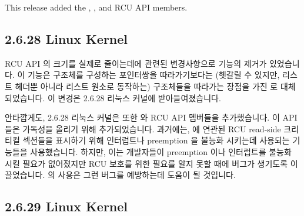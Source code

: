 This release added the
,
, and
 RCU API members.
\fi

\subsection{2.6.28 Linux Kernel}

RCU API 의 크기를 실제로 줄이는데에 관련된 변경사항으로
 기능의 제거가 있었습니다.
이 기능은  구조체를 구성하는 포인터쌍을 따라가기보다는 (헷갈릴 수
있지만, 리스트 헤더뿐 아니라 리스트 원소로 동작하는) 구조체들을 따라가는 장점을
가진  로 대체되었습니다.
이 변경은 2.6.28 리눅스 커널에 받아들여졌습니다.

안타깝게도, 2.6.28 리눅스 커널은 또한  와
 RCU API 멤버들을 추가했습니다.
이 API 들은 가독성을 올리기 위해 추가되었습니다.
과거에는,  에 연관된 RCU read-side 크리티컬 섹션들을
표시하기 위해 인터럽트나 preemption 을 불능화 시키는데 사용되는 기능들을
사용했습니다.
하지만, 이는 개발자들이 preemption 이나 인터럽트를 불능화 시킬 필요가
없어졌지만 RCU 보호를 위한 필요를 알지 못할 때에 버그가 생기도록 이끌었습니다.
 의 사용은 그런 버그를 예방하는데 도움이 될 것입니다.

\subsection{2.6.29 Linux Kernel}

